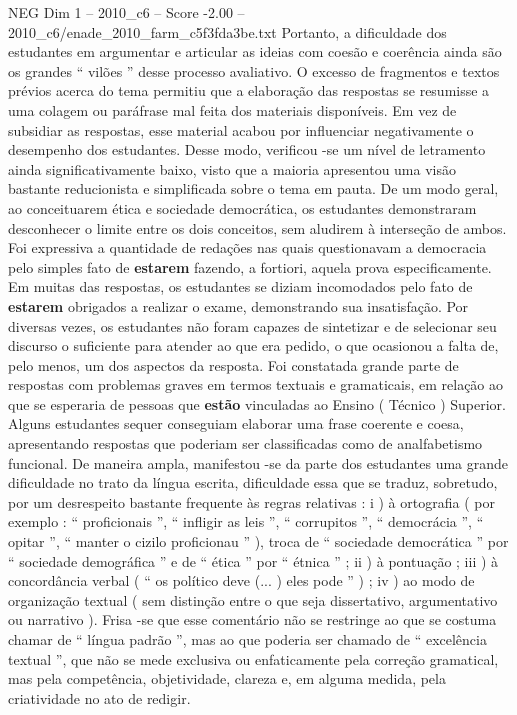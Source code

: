 \begin{textsample}{NEG Dim 1 – 2010\_c6 – Score -2.00 – 2010\_c6/enade\_2010\_farm\_c5f3fda3be.txt}
Portanto, a dificuldade dos estudantes em argumentar e articular as ideias com coesão e coerência ainda são os grandes “ vilões ” desse processo avaliativo.
O excesso de fragmentos e textos prévios acerca do tema permitiu que a elaboração das respostas se resumisse a uma colagem ou paráfrase mal feita dos materiais disponíveis.
Em vez de subsidiar as respostas, esse material acabou por influenciar negativamente o desempenho dos estudantes.
Desse modo, verificou -se um nível de letramento ainda significativamente baixo, visto que a maioria apresentou uma visão bastante reducionista e simplificada sobre o tema em pauta.
De um modo geral, ao conceituarem ética e sociedade democrática, os estudantes demonstraram desconhecer o limite entre os dois conceitos, sem aludirem à interseção de ambos.
Foi expressiva a quantidade de redações nas quais questionavam a democracia pelo simples fato de \textbf{estarem} fazendo, a fortiori, aquela prova especificamente.
Em muitas das respostas, os estudantes se diziam incomodados pelo fato de \textbf{estarem} obrigados a realizar o exame, demonstrando sua insatisfação.
Por diversas vezes, os estudantes não foram capazes de sintetizar e de selecionar seu discurso o suficiente para atender ao que era pedido, o que ocasionou a falta de, pelo menos, um dos aspectos da resposta.
Foi constatada grande parte de respostas com problemas graves em termos textuais e gramaticais, em relação ao que se esperaria de pessoas que \textbf{estão} vinculadas ao Ensino ( Técnico ) Superior.
Alguns estudantes sequer conseguiam elaborar uma frase coerente e coesa, apresentando respostas que poderiam ser classificadas como de analfabetismo funcional.
De maneira ampla, manifestou -se da parte dos estudantes uma grande dificuldade no trato da língua escrita, dificuldade essa que se traduz, sobretudo, por um desrespeito bastante frequente às regras relativas : i ) à ortografia ( por exemplo : “ proficionais ”, “ infligir as leis ”, “ corrupitos ”, “ democrácia ”, “ opitar ”, “ manter o cizilo proficionau ” ), troca de “ sociedade democrática ” por “ sociedade demográfica ” e de “ ética ” por “ étnica ” ; ii ) à pontuação ; iii ) à concordância verbal ( “ os político deve (... ) eles pode ” ) ; iv ) ao modo de organização textual ( sem distinção entre o que seja dissertativo, argumentativo ou narrativo ).
Frisa -se que esse comentário não se restringe ao que se costuma chamar de “ língua padrão ”, mas ao que poderia ser chamado de “ excelência textual ”, que não se mede exclusiva ou enfaticamente pela correção gramatical, mas pela competência, objetividade, clareza e, em alguma medida, pela criatividade no ato de redigir.

\end{textsample}
